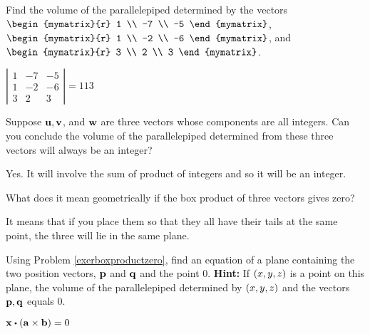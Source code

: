 \begin{enumialphparenastyle}

\begin{ex} Find the volume of the parallelepiped determined by the vectors
$\begin{mymatrix}{r}
1 \\
-7 \\
-5
\end{mymatrix} $, \\
 $\begin{mymatrix}{r}
1 \\
-2 \\
-6
\end{mymatrix}$, and $\begin{mymatrix}{r}
3 \\
2 \\
3
\end{mymatrix}$.
\begin{sol}
 $\left\vert
\begin{array}{rrr}
1 & -7 & -5 \\
1 & -2 & -6 \\
3 & 2 & 3
\end{array}
\right\vert = 113$
\end{sol}
\end{ex}

\begin{ex} Suppose ${\bf u},{\bf v}$, and ${\bf w}$ are three vectors whose
components are all integers. Can you conclude the volume of the
parallelepiped determined from these three vectors will always be an integer?
\begin{sol}
Yes. It will involve the sum of product of integers and so it will
be an integer.
\end{sol}
\end{ex}

\begin{ex} \label{exerboxproductzero} What does it mean geometrically if the box
product of three vectors gives zero?
\begin{sol}
It means that if you place them so that
they all have their tails at the same point, the three will lie in the same
plane.
\end{sol}
\end{ex}

\begin{ex} Using Problem \ref{exerboxproductzero}, find an equation of a plane
containing the two position vectors, ${\bf p}$ and ${\bf q}$ and the
point $0$. 
\textbf{Hint: }If $\left(x,y,z\right) $ is a point on
this plane, the volume of the parallelepiped determined by $\left(
x,y,z\right) $ and the vectors ${\bf p},{\bf q}$ equals 0.
\begin{sol}
$\vect{x}\dotprod \tup{\vect{a}\times \vect{b}} =0$
\end{sol}
\end{ex}


\end{enumialphparenastyle}
